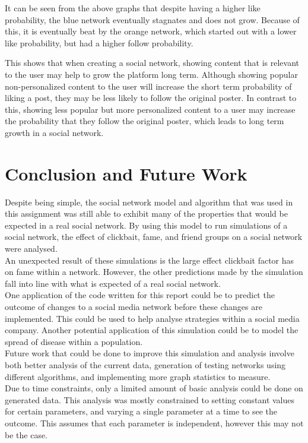 \documentclass{article}
\begin{document}
It can be seen from the above graphs that despite having a higher like probability,
the blue network eventually stagnates and does not grow. Because of this,
it is eventually beat by the orange network, which started out with a lower like probability,
but had a higher follow probability.

This shows that when creating a social network, showing content that is relevant
to the user may help to grow the platform long term. Although showing 
popular non-personalized content to the user will increase the short term probability of liking a post,
they may be less likely to follow the original poster.
In contrast to this, showing less popular but more personalized content to a user
may increase the probability that they follow the original poster, which leads
to long term growth in a social network.

\section{Conclusion and Future Work}
Despite being simple, the social network model and algorithm that was used
in this assignment was still able to exhibit many of the properties
that would be expected in a real social network.
By using this model to run simulations of a social network, the effect of
clickbait, fame, and friend groups on a social network were analysed.\\

An unexpected result of these simulations is the large effect clickbait factor
has on fame within a network. However, the other predictions made by the
simulation fall into line with what is expected of a real social network.\\

One application of the code written for this report could be to predict the outcome
of changes to a social media network before these changes are implemented.
This could be used to help analyse strategies within a social media company.
Another potential application of this simulation could be to model the spread of disease
within a population.\\

Future work that could be done to improve this simulation and analysis involve both better
analysis of the current data, generation of testing networks using different algorithms,
and implementing more graph statistics to measure.\\

Due to time constraints, only a limited amount of basic analysis could be done
on generated data. This analysis was mostly constrained to setting constant values for certain
parameters, and varying a single parameter at a time to see the outcome.
This assumes that each parameter is independent, however this may not be the case.
\end{document}
